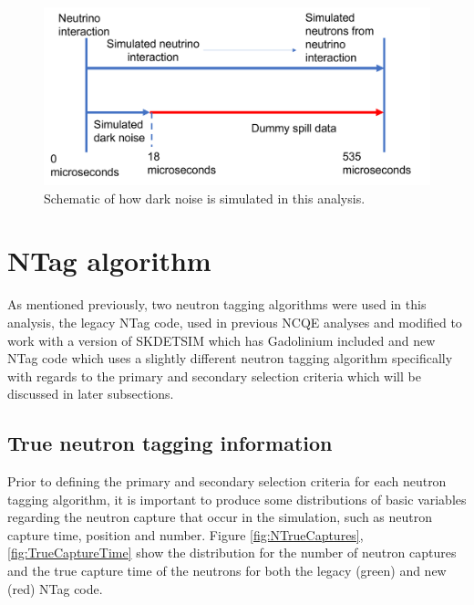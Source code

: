 \begin{figure}

    \includegraphics[width=\textwidth]{Figures/dark_rate_schematic.png}
    \caption{Schematic of how dark noise is simulated in this analysis.}
    \label{fig:dark_rate_schematic}

\end{figure}


\section{NTag algorithm}

As mentioned previously, two neutron tagging algorithms were used in this analysis, the legacy NTag code, used in previous NCQE analyses and modified to work with a version of SKDETSIM which has Gadolinium included and new NTag code which uses a slightly different neutron tagging algorithm specifically with regards to the primary and secondary selection criteria which will be discussed in later subsections.



\subsection{True neutron tagging information}

Prior to defining the primary and secondary selection criteria for each neutron tagging algorithm, it is important to produce some distributions of basic variables regarding the neutron capture that occur in the simulation, such as neutron capture time, position and number. Figure \ref{fig:NTrueCaptures}, \ref{fig:TrueCaptureTime} show the distribution for the number of neutron captures and the true capture time of the neutrons for both the legacy (green) and new (red) NTag code.  

